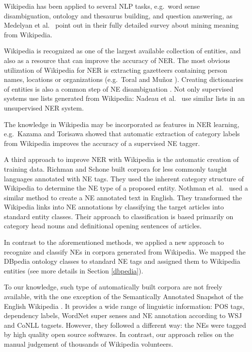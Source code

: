\documentclass[11pt]{article}
\begin{document}
Wikipedia has been applied to several NLP tasks, e.g.~word sense disambiguation, ontology and thesaurus building, and question answering, as Medelyan et al.~ point out in their fully detailed survey about mining meaning from Wikipedia. 

Wikipedia is recognized as one of the largest available collection of entities, and also as a resource that can improve the accuracy of NER. The most obvious utilization of Wikipedia for NER is extracting gazetteers containing person names, locations or organizations (e.g.~Toral and Mu\~noz ). Creating dictionaries of entities is also a common step of NE disambiguation \cite{Bunescu:06,Cucerzan:07}. Not only supervised systems use lists generated from Wikipedia: Nadeau et al.~ use similar lists in an unsupervised NER system. 

The knowledge in Wikipedia may be incorporated as features in NER learning, e.g.~Kazama and Torisawa  showed that automatic extraction of category labels from Wikipedia improves the accuracy of a supervised NE tagger. 

A third approach to improve NER with Wikipedia is the automatic creation of training data. Richman and Schone  built corpora for less commonly taught languages annotated with NE tags. They used the inherent category structure of Wikipedia to determine the NE type of a proposed entity. Nothman et al.~ used a similar method to create a NE annotated text in English. They transformed the Wikipedia links into NE annotations by classifying the target articles into standard entity classes. Their approach to classification is based primarily on category head nouns and definitional opening sentences of articles. 

In contrast to the aforementioned methods, we applied a new approach to recognize and classify NEs in corpora generated from Wikipedia. We mapped the DBpedia ontology classes to standard NE tags and assigned them to Wikipedia entities (see more details in Section \ref{dbpedia}).

To our knowledge, such type of automatically built corpora are not freely available, with the one exception of the Semantically Annotated Snapshot of the English Wikipedia \cite{Zaragoza:07}. It provides a wide range of linguistic information: POS tags, dependency labels, WordNet super senses and NE annotation according to WSJ and CoNLL tagsets. However, they followed a different way: the NEs were tagged by high quality open source softwares. In contrast, our approach relies on the manual judgement of thousands of Wikipedia volunteers.
\end{document}
